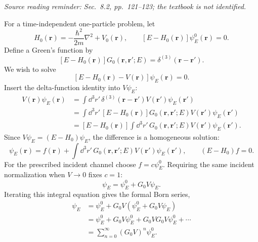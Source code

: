 {\small\textit{Source reading reminder: Sec.\ 8.2, pp.\ 121--123; the textbook is not identified.}}\par
For a time-independent one-particle problem, let
\[
 H_0(\mathbf r)=-\frac{\hbar^2}{2m}\nabla^2+V_0(\mathbf r),
 \qquad [E-H_0(\mathbf r)]\psi_E^0(\mathbf r)=0.
\]
Define a Green's function by
\[
 [E-H_0(\mathbf r)]G_0(\mathbf r,\mathbf r';E)
 =\delta^{(3)}(\mathbf r-\mathbf r').
\]
We wish to solve
\[
 [E-H_0(\mathbf r)-V(\mathbf r)]\psi_E(\mathbf r)=0.
\]
Insert the delta-function identity into $V\psi_E$:
\begin{align*}
 V(\mathbf r)\psi_E(\mathbf r)
 &=\int\dd^3r'\,\delta^{(3)}(\mathbf r-\mathbf r')
                   V(\mathbf r')\psi_E(\mathbf r')\\
 &=\int\dd^3r'\,[E-H_0(\mathbf r)]G_0(\mathbf r,\mathbf r';E)
                   V(\mathbf r')\psi_E(\mathbf r')\\
 &=[E-H_0(\mathbf r)]\int\dd^3r'\,G_0(\mathbf r,\mathbf r';E)
                   V(\mathbf r')\psi_E(\mathbf r').
\end{align*}
Since $V\psi_E=(E-H_0)\psi_E$, the difference is a homogeneous solution:
\[
 \psi_E(\mathbf r)=f(\mathbf r)+
 \int\dd^3r'\,G_0(\mathbf r,\mathbf r';E)V(\mathbf r')\psi_E(\mathbf r'),
 \qquad(E-H_0)f=0.
\]
For the prescribed incident channel choose $f=c\psi_E^0$. Requiring the
same incident normalization when $V\to0$ fixes $c=1$:
\[
 \boxed{\psi_E=\psi_E^0+G_0V\psi_E.}
\]
Iterating this integral equation gives the formal Born series,
\begin{align*}
 \psi_E&=\psi_E^0+G_0V(\psi_E^0+G_0V\psi_E)\\
 &=\psi_E^0+G_0V\psi_E^0+G_0VG_0V\psi_E^0+\cdots\\
 &=\sum_{n=0}^{\infty}(G_0V)^n\psi_E^0.
\end{align*}
